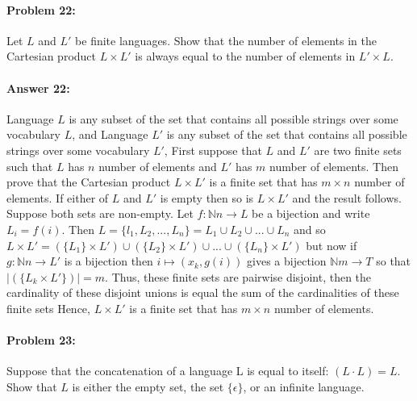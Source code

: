\documentclass[10pt]{article}
\begin{document}
\noindent\hrulefill %

\paragraph{Problem 22:}
Let $L$ and $L'$ be finite languages. Show that the number of elements
in the Cartesian product $L \times L'$ is always equal to the number
of elements in $L' \times L$.

\paragraph{Answer 22:} Language $L$ is any subset of the set that contains all possible strings over some vocabulary $L$, and
Language $L'$ is any subset of the set that contains all possible strings over some vocabulary $L'$,   
First suppose that $L$ and $L'$ are two finite sets such that $L$ has $n$ number of elements and $L'$ has $m$ number of elements. 
Then prove that the Cartesian product $L \times L'$ is a finite set that has $m \times n$ number of elements.
If either of $L$ and $L'$ is empty then so is $L \times L'$ and the result follows. Suppose both sets are non-empty. 
Let $f : \mathbb{N}n \rightarrow L$ be a bijection and write $L_i = f(i)$. Then 
$L = \{l_1, L_2, ..., L_n\} = {L_1} \cup {L_2} \cup...\cup {L_n} $
and so $L \times L' = ( \{ L_1 \} \times L') \cup (\{ L_2 \} \times L') \cup ... \cup (\{L_n\} \times L')$ 
but now if $g:\mathbb{N}n \rightarrow L'$ is a bijection then $i \mapsto (x_k, g(i))$ gives a bijection $\mathbb{N}m \rightarrow T$
so that $|(\{L_k \times L'\})| = m$. Thus, these finite sets are pairwise disjoint, then the cardinality of these disjoint unions is equal the sum of the cardinalities of these finite sets
Hence, $L \times L'$ is a finite set that has $m \times n$ number of elements. 

\noindent\hrulefill %

\paragraph{Problem 23:}

Suppose that the concatenation of a language L is equal to itself:
$(L\cdot L) = L$. Show that $L$ is either the empty set, 
the set $\{\epsilon\}$, or an infinite language.
\end{document}
